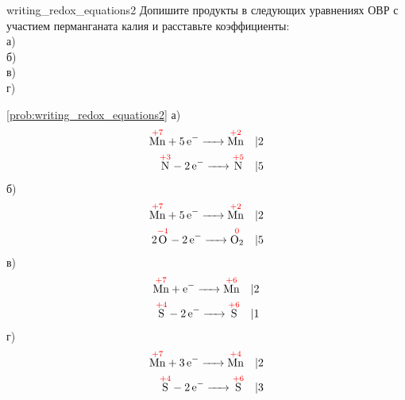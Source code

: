 \begin{problem}{}{writing_redox_equations2}
    Допишите продукты в следующих уравнениях ОВР с участием перманганата калия и расставьте коэффициенты: \\
    а)  \\
    б)  \\
    в)  \\
    г) 
    \begin{sol}{\ref{prob:writing_redox_equations2}}
        а) 
        \begin{align*}
            \overset{\textcolor{red}{+7}}{\ce{Mn}} + \ce{5e- ->} \overset{\textcolor{red}{+2}}{\ce{Mn}} \quad &| 2 \\
            \overset{\textcolor{red}{+3}}{\ce{N}} - \ce{2e- ->} \overset{\textcolor{red}{+5}}{\ce{N}} \quad &| 5
        \end{align*}
        б) 
        \begin{align*}
            \overset{\textcolor{red}{+7}}{\ce{Mn}} + \ce{5e- ->} \overset{\textcolor{red}{+2}}{\ce{Mn}} \quad &| 2 \\
            2\overset{\textcolor{red}{-1}}{\ce{O}} - \ce{2e- ->} \overset{\textcolor{red}{0}}{\ce{O2}} \quad &| 5
        \end{align*}
        в) 
        \begin{align*}
            \overset{\textcolor{red}{+7}}{\ce{Mn}} + \ce{e- ->} \overset{\textcolor{red}{+6}}{\ce{Mn}} \quad &| 2 \\
            \overset{\textcolor{red}{+4}}{\ce{S}} - \ce{2e- ->} \overset{\textcolor{red}{+6}}{\ce{S}} \quad &| 1
        \end{align*}
        г) 
        \begin{align*}
            \overset{\textcolor{red}{+7}}{\ce{Mn}} + \ce{3e- ->} \overset{\textcolor{red}{+4}}{\ce{Mn}} \quad &| 2 \\
            \overset{\textcolor{red}{+4}}{\ce{S}} - \ce{2e- ->} \overset{\textcolor{red}{+6}}{\ce{S}} \quad &| 3
        \end{align*}
    \end{sol}
\end{problem}

\clearpage